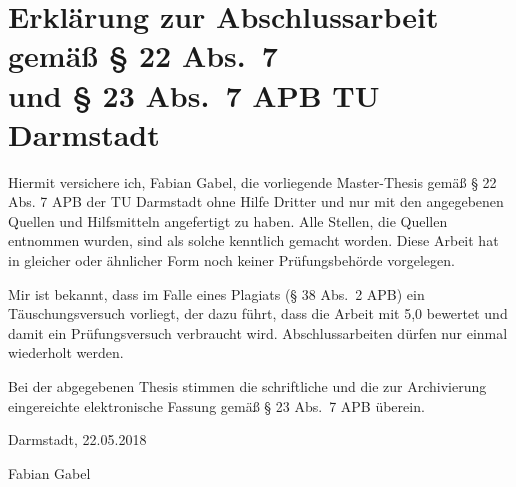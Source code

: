 \thispagestyle{empty}
\section*{Erklärung zur Abschlussarbeit gemäß § 22 Abs.\@~7 \\und § 23 Abs.\@~7 APB TU Darmstadt}

Hiermit versichere ich, Fabian Gabel, die vorliegende Master-Thesis gemäß § 22 Abs. 7 APB der TU Darmstadt ohne Hilfe Dritter und nur mit den angegebenen Quellen und Hilfsmitteln angefertigt zu haben. Alle Stellen, die Quellen entnommen wurden, sind als solche kenntlich gemacht worden. Diese Arbeit hat in gleicher oder ähnlicher Form noch keiner Prüfungsbehörde vorgelegen. 

Mir ist bekannt, dass im Falle eines Plagiats (§ 38 Abs.\@~2 APB) ein Täuschungsversuch vorliegt, der dazu führt, dass die Arbeit mit 5,0 bewertet und damit ein Prüfungsversuch verbraucht wird. Abschlussarbeiten dürfen nur einmal wiederholt werden.

Bei der abgegebenen Thesis stimmen die schriftliche und die zur Archivierung eingereichte elektronische Fassung gemäß § 23 Abs.\@~7 APB überein.

%
%
%
\vspace{20pt}


\noindent
Darmstadt, 22.05.2018\vspace{70pt}


\noindent
Fabian Gabel
